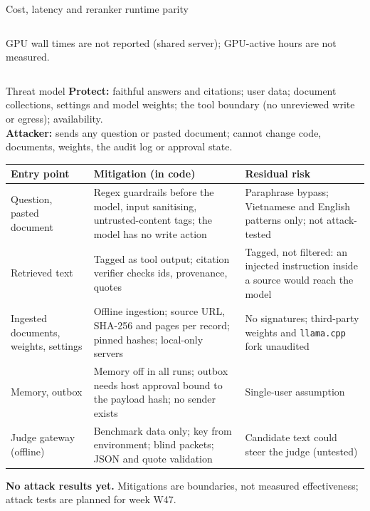 \documentclass[aspectratio=1610,11pt]{beamer}
\begin{document}
\begin{frame}{Cost, latency and reranker runtime parity}
\begin{columns}[T]
    GPU wall times are not reported (shared server); GPU-active hours are not measured.
  \end{columns}
\end{frame}

\begin{frame}{Threat model}
  \footnotesize
  \textbf{Protect:} faithful answers and citations; user data; document collections, settings and model weights; the tool boundary (no unreviewed write or egress); availability.\\
  \textbf{Attacker:} sends any question or pasted document; cannot change code, documents, weights, the audit log or approval state.\\[4pt]
  \scriptsize
  \begin{tabularx}{\textwidth}{@{}>{\raggedright\arraybackslash}p{2.9cm}>{\raggedright\arraybackslash}X>{\raggedright\arraybackslash}X@{}}
    \toprule Entry point & Mitigation (in code) & Residual risk\\\midrule
    Question, pasted document & Regex guardrails before the model, input sanitising, untrusted-content tags; the model has no write action & Paraphrase bypass; Vietnamese and English patterns only; not attack-tested\\
    Retrieved text & Tagged as tool output; citation verifier checks ids, provenance, quotes & Tagged, not filtered: an injected instruction inside a source would reach the model\\
    Ingested documents, weights, settings & Offline ingestion; source URL, SHA-256 and pages per record; pinned hashes; local-only servers & No signatures; third-party weights and \texttt{llama.cpp} fork unaudited\\
    Memory, outbox & Memory off in all runs; outbox needs host approval bound to the payload hash; no sender exists & Single-user assumption\\
    Judge gateway (offline) & Benchmark data only; key from environment; blind packets; JSON and quote validation & Candidate text could steer the judge (untested)\\
    \bottomrule
  \end{tabularx}
  \vspace{5pt}

  \footnotesize \textcolor{dangerred}{\textbf{No attack results yet.}} Mitigations are boundaries, not measured effectiveness; attack tests are planned for week W47.
\end{frame}
\end{document}
